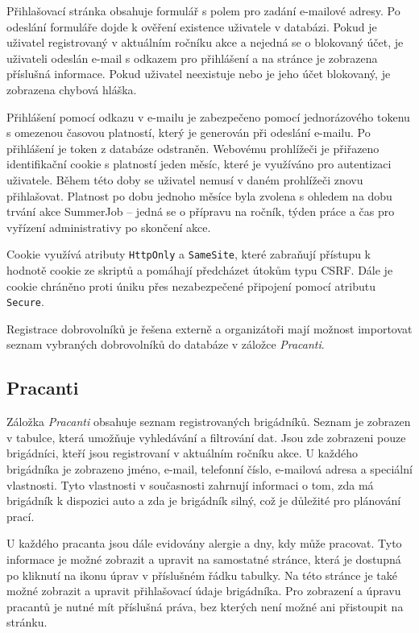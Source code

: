 Přihlašovací stránka obsahuje formulář s polem pro zadání e-mailové adresy. Po odeslání formuláře dojde k ověření existence uživatele v databázi.
Pokud je uživatel registrovaný v aktuálním ročníku akce a nejedná se o blokovaný účet, je uživateli odeslán e-mail s odkazem pro přihlášení a na stránce je 
zobrazena příslušná informace. Pokud uživatel neexistuje nebo je jeho účet blokovaný, je zobrazena chybová hláška.

Přihlášení pomocí odkazu v e-mailu je zabezpečeno pomocí jednorázového tokenu s omezenou časovou platností, který je generován při odeslání e-mailu.
Po přihlášení je token z databáze odstraněn.
Webovému prohlížeči je přiřazeno identifikační cookie s platností jeden měsíc, které je využíváno pro autentizaci uživatele. Během této doby se uživatel nemusí v
daném prohlížeči znovu přihlašovat. Platnost po dobu jednoho měsíce byla zvolena s ohledem na dobu trvání akce SummerJob -- jedná se o přípravu na ročník,
týden práce a čas pro vyřízení administrativy po skončení akce.

Cookie využívá atributy \texttt{HttpOnly} a \texttt{SameSite}, které zabraňují přístupu k hodnotě cookie ze skriptů a
pomáhají předcházet útokům typu CSRF. Dále je cookie chráněno proti úniku přes nezabezpečené připojení pomocí atributu \texttt{Secure}. 

Registrace dobrovolníků je řešena externě a organizátoři mají možnost importovat seznam vybraných dobrovolníků do databáze v záložce \textit{Pracanti}.

\subsection{Pracanti}

Záložka \textit{Pracanti} obsahuje seznam registrovaných brigádníků. Seznam je zobrazen v tabulce, která umožňuje vyhledávání a filtrování dat.
Jsou zde zobrazeni pouze brigádníci, kteří jsou registrovaní v aktuálním ročníku akce. U každého brigádníka je zobrazeno jméno, e-mail, telefonní číslo,
e-mailová adresa a speciální vlastnosti. Tyto vlastnosti v současnosti zahrnují informaci o tom, zda má brigádník k dispozici auto a zda je brigádník silný,
což je důležité pro plánování prací.

U každého pracanta jsou dále evidovány alergie a dny, kdy může pracovat. Tyto informace je možné zobrazit a upravit na samostatné stránce, která je dostupná
po kliknutí na ikonu úprav v příslušném řádku tabulky. Na této stránce je také možné zobrazit a upravit přihlašovací údaje brigádníka. Pro zobrazení a úpravu
pracantů je nutné mít příslušná práva, bez kterých není možné ani přistoupit na stránku.

